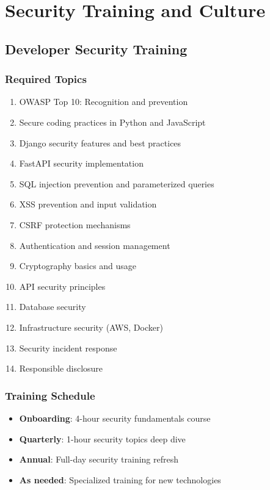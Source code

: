 \documentclass{report}
\begin{document}
\chapter{Security Training and Culture}

\section{Developer Security Training}

\subsection{Required Topics}
\begin{enumerate}
\item OWASP Top 10: Recognition and prevention
\item Secure coding practices in Python and JavaScript
\item Django security features and best practices
\item FastAPI security implementation
\item SQL injection prevention and parameterized queries
\item XSS prevention and input validation
\item CSRF protection mechanisms
\item Authentication and session management
\item Cryptography basics and usage
\item API security principles
\item Database security
\item Infrastructure security (AWS, Docker)
\item Security incident response
\item Responsible disclosure
\end{enumerate}

\subsection{Training Schedule}
\begin{itemize}
\item \textbf{Onboarding}: 4-hour security fundamentals course
\item \textbf{Quarterly}: 1-hour security topics deep dive
\item \textbf{Annual}: Full-day security training refresh
\item \textbf{As needed}: Specialized training for new technologies
\end{itemize}
\end{document}
